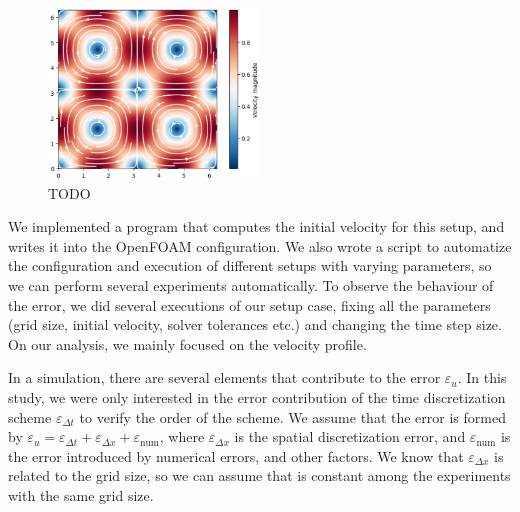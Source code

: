\documentclass[
  english,        %
  font=times,     %
  onecolumn,      %
]{tumarticle}
\begin{document}
\begin{figure}[!ht]
    \centering
    \includegraphics[width=0.5\textwidth]{resources/taylor-green-vortex.png}
    \caption{TODO}
    \label{fig:taylor-green}
\end{figure}

We implemented a program that computes the initial velocity for this setup, and writes it into the OpenFOAM configuration. We also wrote a script to automatize the configuration and execution of different setups with varying parameters, so we can perform several experiments automatically.
To observe the behaviour of the error, we did several executions of our setup case, fixing all the parameters (grid size, initial velocity, solver tolerances etc.) and changing the time step size. On our analysis, we mainly focused on the velocity profile.

In a simulation, there are several elements that contribute to the error $\varepsilon_{u}$. In this study, we were only interested in the error contribution of the time discretization scheme $\varepsilon_{\Delta t}$ to verify the order of the scheme. We assume that the error is formed by $\varepsilon_u = \varepsilon_{\Delta t} + \varepsilon_{\Delta x} + \varepsilon_\text{num}$, where $\varepsilon_{\Delta x}$ is the spatial discretization error, and $\varepsilon_\text{num}$ is the error introduced by numerical errors, and other factors. We know that $\varepsilon_{\Delta x}$ is related to the grid size, so we can assume that is constant among the experiments with the same grid size.
\end{document}
